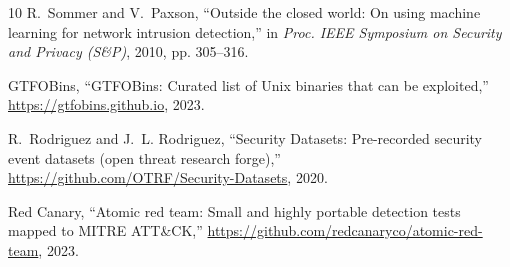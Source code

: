 \documentclass[conference]{IEEEtran}
\begin{document}
\begin{thebibliography}{10}
R.~Sommer and V.~Paxson, ``Outside the closed world: On using machine learning
  for network intrusion detection,'' in \emph{Proc. IEEE Symposium on Security
  and Privacy (S\&P)}, 2010, pp. 305--316.

{GTFOBins}, ``{GTFOBins}: Curated list of {Unix} binaries that can be
  exploited,'' \url{https://gtfobins.github.io}, 2023.

R.~Rodriguez and J.~L. Rodriguez, ``{Security Datasets}: Pre-recorded security
  event datasets (open threat research forge),''
  \url{https://github.com/OTRF/Security-Datasets}, 2020.

{Red Canary}, ``Atomic red team: Small and highly portable detection tests
  mapped to {MITRE ATT\&CK},''
  \url{https://github.com/redcanaryco/atomic-red-team}, 2023.

\end{thebibliography}
\end{document}
